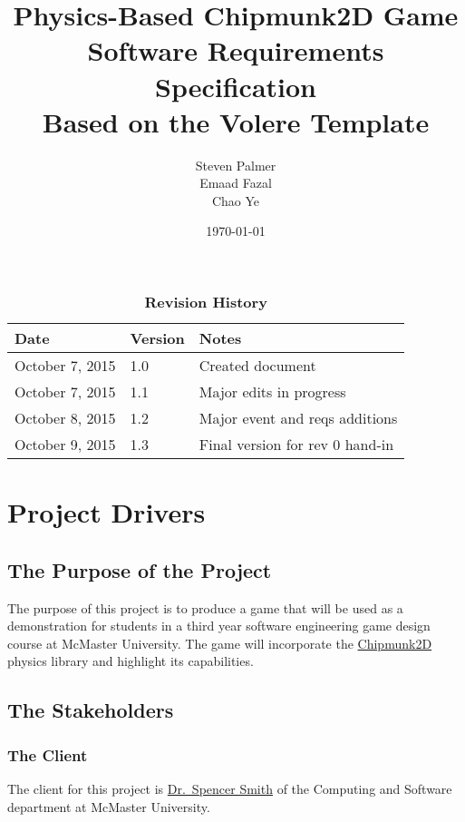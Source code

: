 \documentclass[12pt, titlepage]{article}
\begin{document}
\title{\bf Physics-Based Chipmunk2D Game\\[\baselineskip]\Large Software Requirements Specification\\[2\baselineskip] \large Based on the Volere Template}
\author{Steven Palmer\\Emaad Fazal\\Chao Ye}
\date{\today}
	
\maketitle

\tableofcontents
\listoftables
\listoffigures

\begin{table}[bp]
\caption*{\bf Revision History}
\begin{tabularx}{\textwidth}{p{3cm}p{2cm}X}
\toprule {\bf Date} & {\bf Version} & {\bf Notes}\\
\midrule
October 7, 2015 & 1.0 & Created document\\
October 7, 2015 & 1.1 & Major edits in progress\\
October 8, 2015 & 1.2 & Major event and reqs additions\\
October 9, 2015 & 1.3 & Final version for rev 0 hand-in\\
\bottomrule
\end{tabularx}
\end{table}

\newpage

\section{Project Drivers}
\subsection{The Purpose of the Project}
The purpose of this project is to produce a game that will be used as a demonstration for students in a third year software engineering game design course at McMaster University.  The game will incorporate the \href{https://chipmunk-physics.net/}{Chipmunk2D} physics library and highlight its capabilities.
\subsection{The Stakeholders}
\subsubsection{The Client}
The client for this project is \href{http://www.cas.mcmaster.ca/~smiths/}{Dr.~Spencer Smith} of the Computing and Software department at McMaster University.
\end{document}
